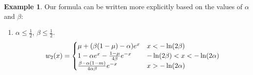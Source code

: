\documentclass[11pt]{article}
\theoremstyle{definition}
\newtheorem{ex}[thm]{Example}
\numberwithin{equation}{section}
\numberwithin{thm}{section}
\renewcommand{\a}{\alpha}
\renewcommand{\b}{\beta}
\newcommand{\m}{\mu}
\begin{document}
\begin{ex}
%
%
%
%
%
%
%
%
%
%
%
%
%
%

Our formula can be written more explicitly based on the values of $\a$ and $\b$:
\begin{enumerate}[{Case} 1.]

\item $\a\leq\frac{1}{2}$, $\b\leq\frac{1}{2}$.
\begin{equation}
w_2(x) = \begin{cases}
\m + (\Conecaseone) e^x  & x < -\ln(2\b) \\
1 - \Ctwocaseone e^x - \Cthreecaseone e^{-x} & -\ln(2\b) < x < -\ln(2\a) \\
\Cfourcaseone e^{-x} & x > -\ln(2\a)
\end{cases}
\end{equation}


\end{enumerate}
\end{ex}
\end{document}
